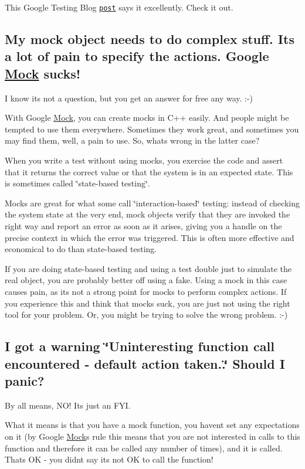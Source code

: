 This Google Testing Blog \href{http://googletesting.blogspot.com/2008/06/defeat-static-cling.html}{\tt post} says it excellently. Check it out.

\subsection*{My mock object needs to do complex stuff. It\textquotesingle{}s a lot of pain to specify the actions. Google \hyperlink{classMock}{Mock} sucks!}

I know it\textquotesingle{}s not a question, but you get an answer for free any way. \+:-\/)

With Google \hyperlink{classMock}{Mock}, you can create mocks in C++ easily. And people might be tempted to use them everywhere. Sometimes they work great, and sometimes you may find them, well, a pain to use. So, what\textquotesingle{}s wrong in the latter case?

When you write a test without using mocks, you exercise the code and assert that it returns the correct value or that the system is in an expected state. This is sometimes called \char`\"{}state-\/based testing\char`\"{}.

Mocks are great for what some call \char`\"{}interaction-\/based\char`\"{} testing\+: instead of checking the system state at the very end, mock objects verify that they are invoked the right way and report an error as soon as it arises, giving you a handle on the precise context in which the error was triggered. This is often more effective and economical to do than state-\/based testing.

If you are doing state-\/based testing and using a test double just to simulate the real object, you are probably better off using a fake. Using a mock in this case causes pain, as it\textquotesingle{}s not a strong point for mocks to perform complex actions. If you experience this and think that mocks suck, you are just not using the right tool for your problem. Or, you might be trying to solve the wrong problem. \+:-\/)

\subsection*{I got a warning \char`\"{}\+Uninteresting function call encountered -\/ default action taken..\char`\"{} Should I panic?}

By all means, N\+O! It\textquotesingle{}s just an F\+YI.

What it means is that you have a mock function, you haven\textquotesingle{}t set any expectations on it (by Google \hyperlink{classMock}{Mock}\textquotesingle{}s rule this means that you are not interested in calls to this function and therefore it can be called any number of times), and it is called. That\textquotesingle{}s OK -\/ you didn\textquotesingle{}t say it\textquotesingle{}s not OK to call the function!

